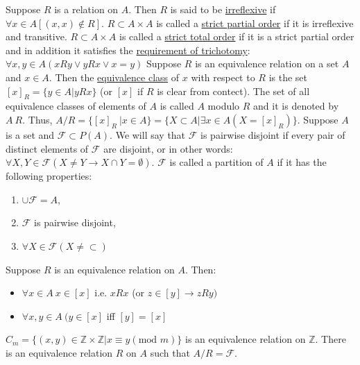 \documentclass[12pt]{article}
\def\mod{\text{mod\ }} %
\begin{document}
\begin{flushleft}
 	\textbullet \quad Suppose $R$ is a relation on $A$. Then $R$ is said to be \uline{irreflexive} if $\forall x \in A \left[(x,x) \notin R \right]$. \linebreak 
 	\textbullet \quad $R\subset A \times A$ is called a \uline{strict partial order} if it is irreflexive and transitive. \linebreak 
 	\textbullet \quad $R\subset A \times A$ is called a \uline{strict total order} if it is a strict partial order and in addition it satisfies the \uline{requirement of trichotomy}: $\displaystyle \forall x, y \in A (xRy \lor yRx \lor x=y) $ \linebreak 
 	\textbullet \quad Suppose $R$ is an equivalence relation on a set $A$ and $x \in A$. Then the \uline{equivalence class} of $x$ with respect to $R$ is the set $\displaystyle [x]_R = \{ y\in A | yRx \}$ (or $[x]$ if $R$ is clear from contect). \linebreak 
 	\textbullet \quad  The set of all equivalence classes of elements of $A$ is called $A$ modulo $R$ and it is denoted by $A \ R$. Thus, $\displaystyle A/R = \{[x]_R \ | x \in A \} = \{ X \subset A | \exists x \in A ( X = [x]_R ) \} $. \linebreak 
 	\textbullet \quad Suppose $A$ is a set and $\mathcal{F} \subset P(A)$. We will say that $\mathcal{F}$ is pairwise disjoint if every pair of distinct elements of $\mathcal{F}$ are disjoint, or in other words: $\displaystyle \forall X, Y \in \mathcal{F} \left(X \neq Y \rightarrow X \cap Y = \emptyset \right)$. \linebreak 
 	\textbullet \quad $\mathcal{F}$ is called a partition of $A$ if it has the following properties:  
 	\begin{enumerate}
 	\item $\cup \mathcal{F} = A$, 
 	\item $\mathcal{F}$ is pairwise disjoint, 
 	\item $\forall X \in \mathcal{F} \left(X\neq \subset \right) $  
 	\end{enumerate}
 	\textbullet \quad Suppose $R$ is an equivalence relation on $A$. Then:  
 	\begin{itemize}
	 	\renewcommand{\labelitemi}{$\rightarrow$}
	 \item $\forall x \in A \ x\in [x]$ i.e. $xRx$ (or $z \in [y] \rightarrow zRy )$ 
	 \item $\forall x,y \in A\ (y \in [x]$ iff $[y] = [x]$ \linebreak 
 	\end{itemize}
 	\textbullet \quad $\displaystyle C_m = \{ (x,y) \in \mathbb{Z} \times \mathbb{Z} | x \equiv y(\mod m) \}$ is an equivalence relation on $\mathbb{Z} $. \linebreak 
 	\textbullet \quad There is an equivalence relation $R$ on $A$ such that $A/R = \mathcal{F}$. \linebreak 
 	


\end{flushleft}
\end{document}
